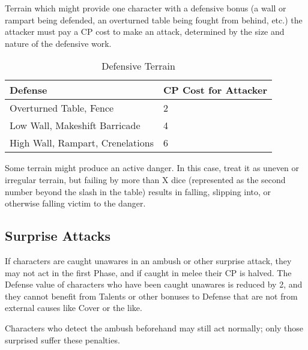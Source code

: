 \documentclass[oneside,11pt,english]{book}
\begin{document}
Terrain which might provide one character with a defensive bonus (a wall or rampart being defended, an
overturned table being fought from behind, etc.) the attacker must pay a CP cost to make an attack,
determined by the size and nature of the defensive work.
\begin{table}[ht]
	\caption{Defensive Terrain}
	\label{tab:Defensive Terrain}
	\begin{tabu} spread 0pt {X[-1]X[-1]}
Defense & CP Cost for Attacker\\ \toprule
Overturned Table, Fence&2\\
Low Wall, Makeshift Barricade&4\\
High Wall, Rampart, Crenelations&6\\
	\end{tabu}
\end{table}

Some terrain might produce an active danger. In this case, treat it as uneven or irregular terrain, but failing by more than X dice (represented as the second number beyond the slash in the table) results in falling, slipping into, or otherwise falling victim to the danger.

\subsection{Surprise Attacks}
If characters are caught unawares in an ambush or other surprise attack, they may not act in the first Phase, and if caught in melee their CP is halved. The Defense value of characters who have been caught unawares is reduced by 2, and they cannot benefit from Talents or other bonuses to Defense that are not from external causes like Cover or the like. 

Characters who detect the ambush beforehand may still act normally; only those surprised suffer these penalties.
\end{document}
